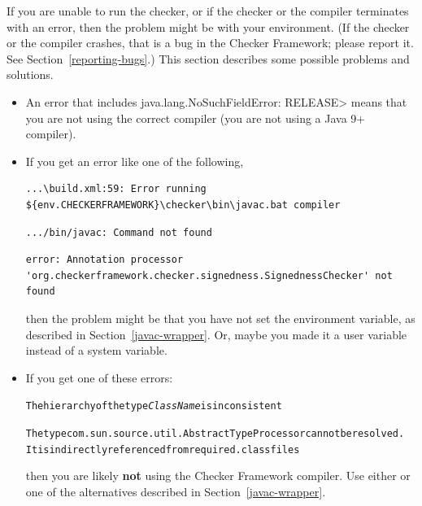 
If you are unable to run the checker, or if the checker or the compiler
terminates with an error, then the problem might be with your environment.
(If the checker or the compiler crashes, that is a bug in the Checker
Framework; please report it.  See Section~\ref{reporting-bugs}.)
This section describes some possible problems and solutions.

\begin{itemize}
\item
  \label{no-such-field-error-release}
  An error that includes \<java.lang.NoSuchFieldError: RELEASE> means that
  you are not using the correct compiler (you are not using a Java 9+ compiler).

\item
If you get an error like one of the following,

\begin{smaller}
\begin{Verbatim}
...\build.xml:59: Error running ${env.CHECKERFRAMEWORK}\checker\bin\javac.bat compiler
\end{Verbatim}

\begin{Verbatim}
.../bin/javac: Command not found
\end{Verbatim}

\begin{Verbatim}
error: Annotation processor 'org.checkerframework.checker.signedness.SignednessChecker' not found
\end{Verbatim}
\end{smaller}

\noindent
then the problem might be that you have not set the  environment
variable, as described in Section~\ref{javac-wrapper}.  Or, maybe
you made it a user variable instead of a system variable.

\item
If you get one of these errors:

\begin{alltt}
The hierarchy of the type \emph{ClassName} is inconsistent

The type com.sun.source.util.AbstractTypeProcessor cannot be resolved.
  It is indirectly referenced from required .class files
\end{alltt}

\begin{sloppypar}
\noindent
then you are likely \textbf{not} using the Checker Framework compiler.  Use
either  or one of the alternatives
described in Section~\ref{javac-wrapper}.
\end{sloppypar}


\end{itemize}
